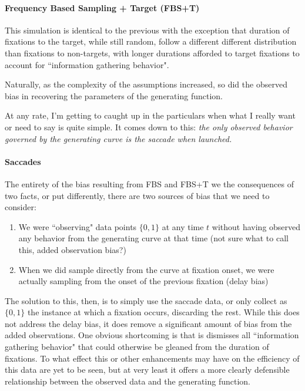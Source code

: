 \documentclass{article}
\begin{document}
\paragraph{Frequency Based Sampling + Target (FBS+T)} This simulation is identical to the previous with the exception that duration of fixations to the target, while still random, follow a different different distribution than fixations to non-targets, with longer durations afforded to target fixations to account for ``information gathering behavior". 

Naturally, as the complexity of the assumptions increased, so did the observed bias in recovering the parameters of the generating function.

At any rate, I'm getting to caught up in the particulars when what I really want or need to say is quite simple. It comes down to this: \textit{the only observed behavior governed by the generating curve is the saccade when launched.}

\paragraph{Saccades}

The entirety of the bias resulting from FBS and FBS+T we the consequences of two facts, or put differently, there are two sources of bias that we need to consider:
\begin{singlespace}
\begin{enumerate}
\item We were ``observing" data points $\{0,1\}$ at any time $t$ without having observed any behavior from the generating curve at that time (not sure what to call this, added observation bias?)
\item When we did sample directly from the curve at fixation onset, we were actually sampling from the onset of the previous fixation (delay bias)
\end{enumerate}
\end{singlespace}

The solution to this, then, is to simply use the saccade data, or only collect as $\{0,1\}$ the instance at which a fixation occurs, discarding the rest. While this does not address the delay bias, it does remove a significant amount of bias from the added observations. One obvious shortcoming is that is dismisses all ``information gathering behavior" that could otherwise be gleaned from the  duration of fixations. To what effect this or other enhancements may have on the efficiency of this data are yet to be seen, but at very least it offers a more clearly defensible relationship between the observed data and the generating function.
\end{document}
